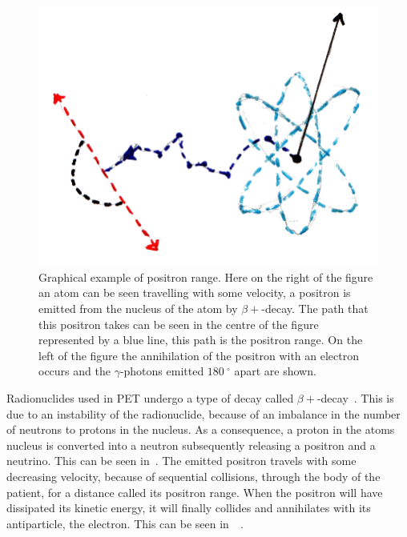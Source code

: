                 \begin{figure}
                    \centering
                    
                    \includegraphics[width=1.0\linewidth]{figures/background_positron_range.png}
                    
                    \captionsetup{singlelinecheck=false, justification=raggedright}
                    \caption{Graphical example of positron range. Here on the right of the figure an atom can be seen travelling with some velocity, a positron is emitted from the nucleus of the atom by $\beta+$-decay. The path that this positron takes can be seen in the centre of the figure represented by a blue line, this path is the positron range. On the left of the figure the annihilation of the positron with an electron occurs and the $\gamma$-photons emitted $\SI{180}{^{\circ}}$ apart are shown.} \label{fig:decay_and_annihilation_positron_range}
                \end{figure}
                
                Radionuclides used in \gls{PET} undergo a type of decay called $\beta+$-decay~\parencite{conti_beta}. This is due to an instability of the radionuclide, because of an imbalance in the number of neutrons to protons in the nucleus. As a consequence, a proton in the atoms nucleus is converted into a neutron subsequently releasing a positron and a neutrino. This can be seen in~. The emitted positron travels with some decreasing velocity, because of sequential collisions, through the body of the patient, for a distance called its positron range.  When the positron will have dissipated its kinetic energy, it will finally collides and annihilates with its antiparticle, the electron. This can be seen in~~\parencite{EvansPositronBib}. %
                
